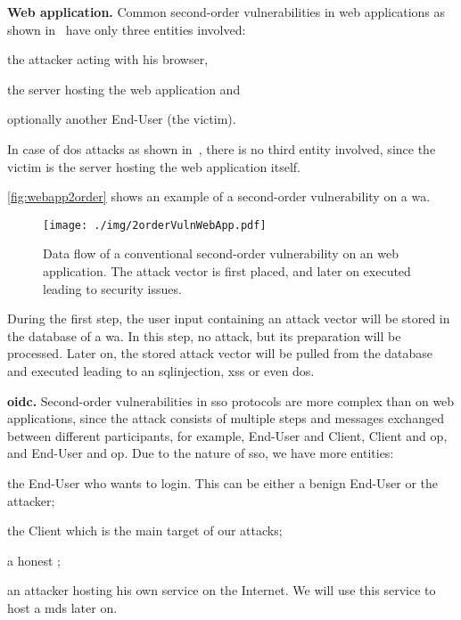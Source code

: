 \documentclass[conference,compsoc]{IEEEtran}
\renewcommand*{\paragraph}[1]{\vspace{2mm}\noindent\textbf{#1.}}
\begin{document}
\paragraph{Web application}
Common second-order vulnerabilities in web applications as shown in~\cite{Dahse2014,Olivo2015} have only three entities involved:
\begin{inparaenum}
	\item the attacker acting with his browser,
	\item the server hosting the web application and
	\item optionally another End-User (the victim).
\end{inparaenum}
In case of \gls{dos} attacks as shown in~\cite{Olivo2015}, there is no third entity involved, since the victim is the server hosting the web application itself.

\autoref{fig:webapp2order} shows an example of a second-order vulnerability on a \gls{wa}.
\begin{figure}[!ht]
 \centering
 \texttt{[image: ./img/2orderVulnWebApp.pdf]}
\caption{Data flow of a conventional second-order vulnerability on an web application. The attack vector  is first placed, and later on executed leading to security issues.}
 \label{fig:webapp2order}
\end{figure}


During the first step, the user input containing an attack vector will be stored in the database of a \gls{wa}. In this step, no attack, but its preparation will be processed.
Later on, the stored attack vector will be pulled from the database and executed leading to an \gls{sqlinjection}, \gls{xss} or even \gls{dos}.


\paragraph{\gls{oidc}}
Second-order vulnerabilities in \gls{sso} protocols are more complex than on web applications, since the attack consists of multiple steps and messages exchanged between different participants, for example, End-User and Client, Client and \gls{op}, and End-User and \gls{op}.
Due to the nature of \gls{sso}, we have more entities:
\begin{inparaenum}
	\item the End-User who wants to login. This can be either a benign End-User or the attacker;
	\item the Client which is the main target of our attacks;
	\item a honest ;
	\item an attacker hosting his own service on the Internet. We will use this service to host a \gls{mds} later on.
\end{inparaenum}
\end{document}
